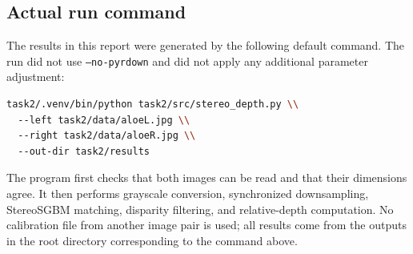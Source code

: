 \subsection{Actual run command}

The results in this report were generated by the following default command. The run did not use \texttt{--no-pyrdown} and did not apply any additional parameter adjustment:

\begin{lstlisting}[language=bash]
task2/.venv/bin/python task2/src/stereo_depth.py \\
  --left task2/data/aloeL.jpg \\
  --right task2/data/aloeR.jpg \\
  --out-dir task2/results
\end{lstlisting}

The program first checks that both images can be read and that their dimensions agree. It then performs grayscale conversion, synchronized downsampling, StereoSGBM matching, disparity filtering, and relative-depth computation. No calibration file from another image pair is used; all results come from the outputs in the root directory corresponding to the command above.
